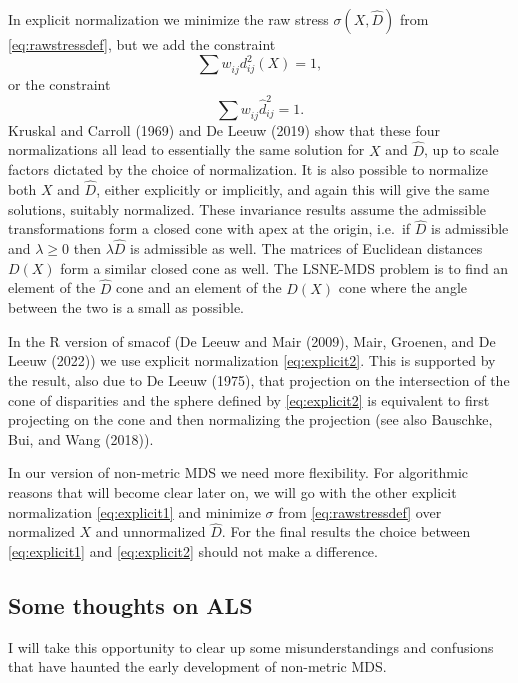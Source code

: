 \documentclass[
  12pt,
]{article}
\begin{document}
In explicit normalization we minimize the raw stress \(\sigma(X,\hat D)\)
from \eqref{eq:rawstressdef}, but we add the constraint
\begin{equation}
\sum   w_{ij}^{\ }d_{ij}^2(X)=1,
\label{eq:explicit1}
\end{equation}
or the constraint
\begin{equation}
\sum   w_{ij}^{\ }\hat d_{ij}^2=1.
\label{eq:explicit2}
\end{equation}
Kruskal and Carroll (1969) and De Leeuw (2019) show that these
four normalizations all lead to essentially the same solution for \(X\)
and \(\hat D\), up to scale factors dictated by the choice of
normalization. It is also possible to normalize both \(X\) and \(\hat D\),
either explicitly or implicitly, and again this will give the same
solutions, suitably normalized. These invariance results assume the
admissible transformations form a closed cone with apex at the origin,
i.e.~if \(\hat D\) is admissible and \(\lambda\geq 0\) then \(\lambda\hat D\)
is admissible as well. The matrices of Euclidean distances \(D(X)\) form a
similar closed cone as well. The LSNE-MDS problem is to find an element of the
\(\hat D\) cone and an element of the \(D(X)\) cone where the angle between
the two is a small as possible.

In the R version of smacof (De Leeuw and Mair (2009),
Mair, Groenen, and De Leeuw (2022)) we use explicit normalization
\eqref{eq:explicit2}. This is supported by the result, also due to
De Leeuw (1975), that projection on the intersection of the cone of
disparities and the sphere defined by \eqref{eq:explicit2} is equivalent
to first projecting on the cone and then normalizing the projection (see
also Bauschke, Bui, and Wang (2018)).

In our version of non-metric MDS we need more flexibility. For algorithmic
reasons that will become clear later on, we will go with the other explicit
normalization \eqref{eq:explicit1} and minimize \(\sigma\) from
\eqref{eq:rawstressdef} over normalized \(X\) and unnormalized \(\hat D\).
For the final results the choice between \eqref{eq:explicit1} and
\eqref{eq:explicit2} should not make a difference.

\subsection{Some thoughts on ALS}\label{some-thoughts-on-als}

I will take this opportunity to clear up some misunderstandings and confusions
that have haunted the early development of non-metric MDS.
\end{document}
